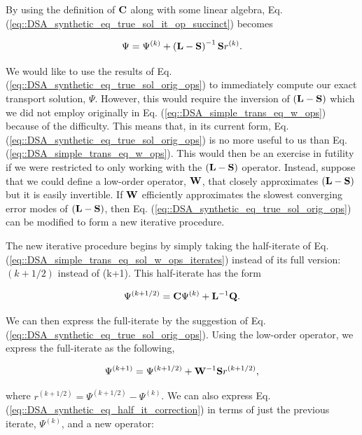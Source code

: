\noindent By using the definition of ${\bf C}$ along with some linear algebra, Eq. (\ref{eq::DSA_synthetic_eq_true_sol_it_op_succinct}) becomes 

\begin{equation}
\label{eq::DSA_synthetic_eq_true_sol_orig_ops}
\Psi = \Psi^{(k)} + \left(  {\bf L} - {\bf S}   \right)^{-1} {\bf S} r^{(k)}.
\end{equation}

We would like to use the results of Eq. (\ref{eq::DSA_synthetic_eq_true_sol_orig_ops}) to immediately compute our exact transport solution, $\Psi$. However, this would require the inversion of $\left(  {\bf L} - {\bf S}  \right)$ which we did not employ originally in Eq. (\ref{eq::DSA_simple_trans_eq_w_ops}) because of the difficulty. This means that, in its current form, Eq. (\ref{eq::DSA_synthetic_eq_true_sol_orig_ops}) is no more useful to us than Eq. (\ref{eq::DSA_simple_trans_eq_w_ops}). This would then be an exercise in futility if we were restricted to only working with the $\left(  {\bf L} - {\bf S}  \right)$ operator. Instead, suppose that we could define a low-order operator, ${\bf W}$, that closely approximates $\left(  {\bf L} - {\bf S}  \right)$ but it is easily invertible. If ${\bf W}$ efficiently approximates the slowest converging error modes of $\left(  {\bf L} - {\bf S}  \right)$, then Eq. (\ref{eq::DSA_synthetic_eq_true_sol_orig_ops}) can be modified to form a new iterative procedure.

The new iterative procedure begins by simply taking the half-iterate of Eq. (\ref{eq::DSA_simple_trans_eq_sol_w_ops_iterates}) instead of its full version: ${(k+1/2)}$ instead of {(k+1)}. This half-iterate has the form

\begin{equation}
\label{eq::DSA_synthetic_eq_half_it}
\Psi^{(k+1/2)} = {\bf C} \Psi^{(k)} + {\bf L}^{-1} {\bf Q}.
\end{equation}

\noindent We can then express the full-iterate by the suggestion of Eq. (\ref{eq::DSA_synthetic_eq_true_sol_orig_ops}). Using the low-order operator, we express the full-iterate as the following,

\begin{equation}
\label{eq::DSA_synthetic_eq_half_it_correction}
\Psi^{(k+1)} =\Psi^{(k+1/2)} + {\bf W}^{-1} {\bf S}  r^{(k+1/2)},
\end{equation}

\noindent where $r^{(k+1/2)} = \Psi^{(k+1/2)} - \Psi^{(k)}$. We can also express Eq. (\ref{eq::DSA_synthetic_eq_half_it_correction}) in terms of just the previous iterate, $\Psi^{(k)}$, and a new operator:

